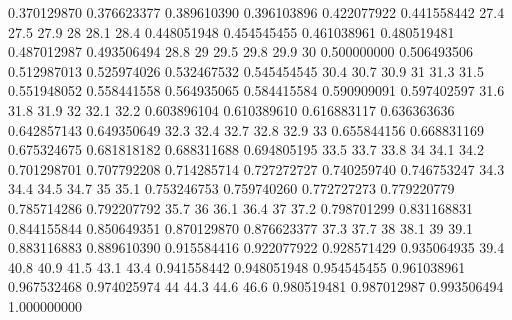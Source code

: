 \documentclass[a4paper]{article}
\begin{document}
\begin{Schunk}
\begin{Soutput}
0.370129870 0.376623377 0.389610390 0.396103896 0.422077922 0.441558442 
       27.4        27.5        27.9          28        28.1        28.4 
0.448051948 0.454545455 0.461038961 0.480519481 0.487012987 0.493506494 
       28.8          29        29.5        29.8        29.9          30 
0.500000000 0.506493506 0.512987013 0.525974026 0.532467532 0.545454545 
       30.4        30.7        30.9          31        31.3        31.5 
0.551948052 0.558441558 0.564935065 0.584415584 0.590909091 0.597402597 
       31.6        31.8        31.9          32        32.1        32.2 
0.603896104 0.610389610 0.616883117 0.636363636 0.642857143 0.649350649 
       32.3        32.4        32.7        32.8        32.9          33 
0.655844156 0.668831169 0.675324675 0.681818182 0.688311688 0.694805195 
       33.5        33.7        33.8          34        34.1        34.2 
0.701298701 0.707792208 0.714285714 0.727272727 0.740259740 0.746753247 
       34.3        34.4        34.5        34.7          35        35.1 
0.753246753 0.759740260 0.772727273 0.779220779 0.785714286 0.792207792 
       35.7          36        36.1        36.4          37        37.2 
0.798701299 0.831168831 0.844155844 0.850649351 0.870129870 0.876623377 
       37.3        37.7          38        38.1          39        39.1 
0.883116883 0.889610390 0.915584416 0.922077922 0.928571429 0.935064935 
       39.4        40.8        40.9        41.5        43.1        43.4 
0.941558442 0.948051948 0.954545455 0.961038961 0.967532468 0.974025974 
         44        44.3        44.6        46.6 
0.980519481 0.987012987 0.993506494 1.000000000 
\end{Soutput}
\end{Schunk}
\end{document}
